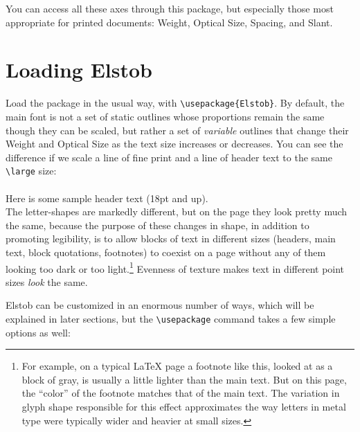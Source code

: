 \documentclass[12pt]{article}
\begin{document}
\noindent You can access all these axes through this package, but
especially those most appropriate for printed documents: Weight, Optical Size,
Spacing, and Slant.


\section{Loading Elstob}

Load the package in the usual way, with {\color{BrickRed}\verb|\usepackage{Elstob}|}.
By default, the main font is not a set of static outlines whose proportions
remain the same though they can be scaled, but rather a set of
\emph{variable} outlines that change their Weight and Optical Size as the text size increases
or decreases. You can see the difference if we scale a line of fine print
and a line of header text to the same {\color{BrickRed}\verb|\large|} size:\\[0.5ex]

\\[0.2ex]
{\large\sampleheader Here is some sample header text (18pt and up).}\\[0.5ex]

\noindent The letter-shapes are markedly different, but on the page they look
pretty much the same, because the purpose of these changes in
shape, in addition to promoting legibility,
is to allow blocks of text in different sizes (headers, main text,
block quotations, footnotes) to coexist on a page without any of them looking too
dark or too light.\footnote{%
For example, on a typical LaTeX page a footnote like this, looked at as a block
of gray, is usually a little lighter than the main text. But on this page, the
“color” of the footnote matches that of the main text. The variation in glyph
shape responsible for this effect approximates the way letters in metal type were
typically wider and heavier at small sizes.} Evenness of texture makes text in
different point sizes \emph{look} the same.

Elstob can be customized in an enormous number of ways, which will be explained
in later sections, but the {\color{BrickRed}\verb|\usepackage|} command takes a few simple options
as well:
\end{document}
